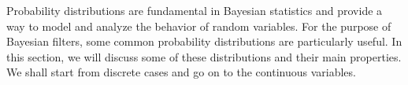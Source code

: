 Probability distributions are fundamental in Bayesian statistics and
provide a way to model and analyze the behavior of random variables. For
the purpose of Bayesian filters, some common probability distributions
are particularly useful. In this section, we will discuss some of these
distributions and their main properties. We shall start from discrete
cases and go on to the continuous variables.  %
